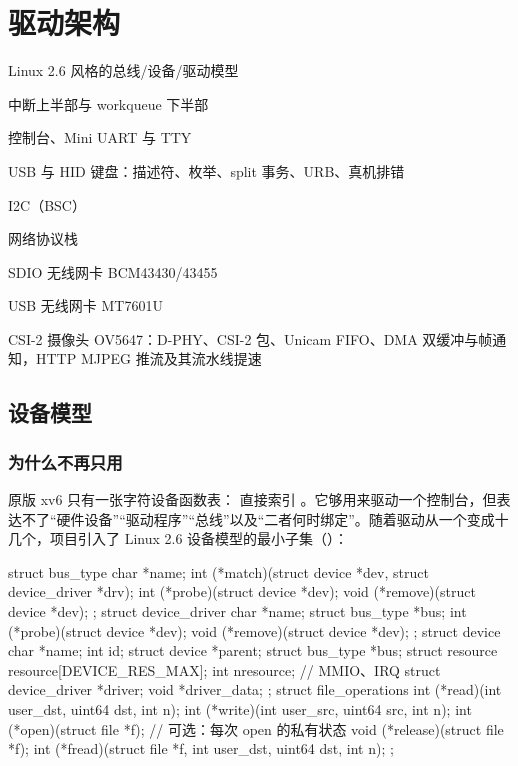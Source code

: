 \chapter{驱动架构}
\label{chap:drivers}

\begin{introduction}[本章内容]
  \item Linux 2.6 风格的总线/设备/驱动模型
  \item 中断上半部与 workqueue 下半部
  \item 控制台、Mini UART 与 TTY
  \item USB 与 HID 键盘：描述符、枚举、split 事务、URB、真机排错
  \item I2C（BSC）
  \item 网络协议栈
  \item SDIO 无线网卡 BCM43430/43455
  \item USB 无线网卡 MT7601U
  \item CSI-2 摄像头 OV5647：D-PHY、CSI-2 包、Unicam FIFO、DMA 双缓冲与帧通知，HTTP MJPEG 推流及其流水线提速
\end{introduction}

\section{设备模型}
\label{sec:devmodel}

\subsection{为什么不再只用 }

原版 xv6 只有一张字符设备函数表： 直接索引 。它够用来驱动一个控制台，但表达不了“硬件设备”“驱动程序”“总线”以及“二者何时绑定”。随着驱动从一个变成十几个，项目引入了 Linux 2.6 设备模型的最小子集（）：

\begin{ccode}
struct bus_type {
  char *name;
  int  (*match)(struct device *dev, struct device_driver *drv);
  int  (*probe)(struct device *dev);
  void (*remove)(struct device *dev);
};
struct device_driver {
  char *name;  struct bus_type *bus;
  int  (*probe)(struct device *dev);
  void (*remove)(struct device *dev);
};
struct device {
  char *name;  int id;  struct device *parent;  struct bus_type *bus;
  struct resource resource[DEVICE_RES_MAX];  int nresource;  // MMIO、IRQ
  struct device_driver *driver;  void *driver_data;
};
struct file_operations {
  int  (*read)(int user_dst, uint64 dst, int n);
  int  (*write)(int user_src, uint64 src, int n);
  int  (*open)(struct file *f);                 // 可选：每次 open 的私有状态
  void (*release)(struct file *f);
  int  (*fread)(struct file *f, int user_dst, uint64 dst, int n);
};
\end{ccode}

